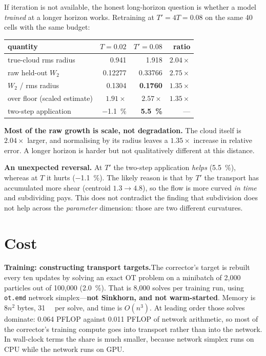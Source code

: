 ﻿\documentclass[11pt,a4paper]{article}
\newcommand{\Wtwo}{W_2}
\begin{document}
If iteration is not available, the honest long-horizon question is whether a model \emph{trained} at
a longer horizon works. Retraining at $T'=4T=0.08$ on the same 40 cells with the same budget:

\begin{table}[h]
\centering\small
\begin{tabular}{@{}lrrr@{}}
\toprule
quantity & $T=0.02$ & $T'=0.08$ & ratio \\
\midrule
true-cloud rms radius & 0.941 & 1.918 & $2.04\times$ \\
raw held-out $\Wtwo$ & 0.12277 & 0.33766 & \textbf{$2.75\times$} \\
$\Wtwo$ / rms radius & 0.1304 & \textbf{0.1760} & \textbf{$1.35\times$} \\
over floor (scaled estimate) & $1.91\times$ & $2.57\times$ & $1.35\times$ \\
two-step application & \SI{-1.1}{\percent} & \textbf{\SI{5.5}{\percent}} & --- \\
\bottomrule
\end{tabular}
\end{table}

\textbf{Most of the raw growth is scale, not degradation.} The cloud itself is $2.04\times$ larger,
and normalising by its radius leaves a \textbf{$1.35\times$} increase in relative error. A longer
horizon is harder but not qualitatively different at this distance.

\textbf{An unexpected reversal.} At $T'$ the two-step application \emph{helps} (\SI{5.5}{\percent}),
whereas at $T$ it hurts (\SI{-1.1}{\percent}). The likely reason is that by $T'$ the transport has
accumulated more shear (centroid $1.3\to4.8$), so the flow is more curved \emph{in time} and
subdividing pays. This does not contradict the finding that subdivision does not help across the
\emph{parameter} dimension: those are two different curvatures.

\section{Cost}

\textbf{Training: constructing transport targets.}\hspace{0.4em}The corrector's target is rebuilt
every ten updates by solving an exact OT problem on a minibatch of 2{,}000 particles out of
100{,}000 (\SI{2.0}{\percent}). That is 8{,}000 solves per training run, using \texttt{ot.emd}
network simplex---\textbf{not Sinkhorn, and not warm-started}. Memory is $8n^2$ bytes, \SI{31}{\mega\byte}
per solve, and time is $O(n^3)$. At leading order those solves dominate: 0.064 PFLOP
against 0.011 PFLOP of network arithmetic, so most of the corrector's training compute
goes into transport rather than into the network. In wall-clock terms the share is much smaller,
because network simplex runs on CPU while the network runs on GPU.
\end{document}
